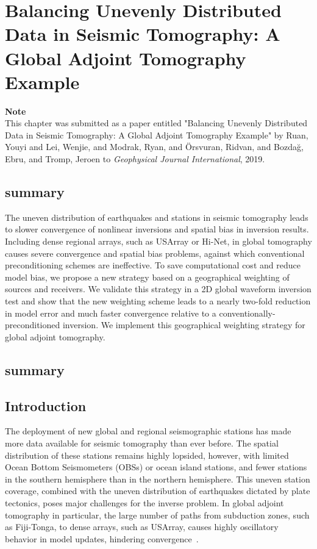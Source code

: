 \chapter{Balancing Unevenly Distributed Data in Seismic Tomography: {A} Global Adjoint Tomography Example\label{ch:weighting}}

\textbf{Note}\\
This chapter was submitted as a paper entitled "Balancing Unevenly Distributed Data in Seismic Tomography: {A} Global Adjoint Tomography Example" by Ruan, Youyi and Lei, Wenjie, and Modrak, Ryan, and \"{O}rsvuran, Ridvan, and Bozda\u{g}, Ebru, and Tromp, Jeroen to \textit{Geophysical Journal International}, 2019.


\section{summary}
The uneven distribution of earthquakes and stations in seismic tomography leads to slower convergence of nonlinear inversions and spatial bias in inversion results.
Including dense regional arrays, such as USArray or Hi-Net, in global tomography causes severe convergence and spatial bias problems, against which conventional preconditioning  schemes are ineffective.
To save computational cost and reduce model bias, we propose a new strategy based on a geographical weighting of sources and receivers.
We validate this strategy in
a 2D global waveform inversion test and show that the new weighting scheme leads to a nearly two-fold reduction in model error and much faster convergence relative to a conventionally-preconditioned inversion.
We implement this geographical weighting strategy for global adjoint tomography.
\section{summary}

%
%
\section{Introduction}

The deployment of new global and regional seismographic stations has made  more data available for seismic tomography than ever before.
The spatial distribution of these stations remains highly lopsided, however, with limited Ocean Bottom Seismometers (OBSs) or ocean island stations,
and fewer stations in the southern hemisphere than in the northern hemisphere. 
This uneven station coverage, combined with the uneven distribution of earthquakes dictated by plate tectonics, poses major challenges for the inverse problem.   In global adjoint tomography in particular, the large number of paths from subduction zones, such as Fiji-Tonga, to dense arrays,  such as USArray,  causes highly oscillatory behavior in model updates, hindering convergence~\cite{bozdaug2016global}. 

